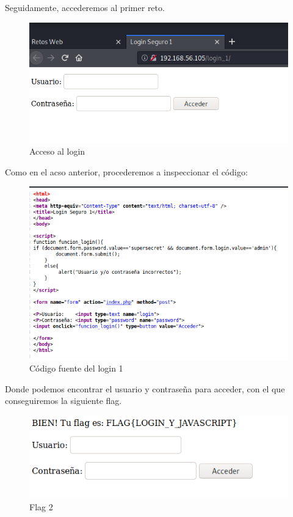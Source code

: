 \documentclass[12pt,twoside]{article}
\begin{document}
Seguidamente, accederemos al primer reto.

\begin{figure}[h]
    \centering
    \includegraphics[scale=0.75]{./imagenes/login_1}
    \caption{Acceso al login}
\end{figure}

Como en el acso anterior, procederemos a inspeccionar el código:

\begin{figure}[h]
    \centering
    \includegraphics[scale=0.75]{./imagenes/login_1_fuente}
    \caption{Código fuente del login 1}
\end{figure}

Donde podemos encontrar el usuario y contraseña para acceder, con el que conseguiremos la siguiente flag.

\begin{figure}[h]
    \centering
    \includegraphics[scale=0.75]{./imagenes/login_1_flag}
    \caption{Flag 2}
\end{figure}
\end{document}
